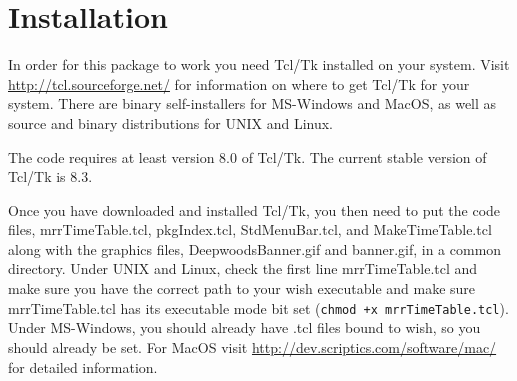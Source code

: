 
\chapter{Installation}
\label{chapt:Installation}

In order for this package to work you need Tcl/Tk installed on your
system.  Visit \url{http://tcl.sourceforge.net/} for information on where to
get Tcl/Tk for your system.  There are binary self-installers for
MS-Windows and MacOS, as well as source and binary distributions for
UNIX and Linux.

The code requires at least version 8.0 of Tcl/Tk.  The current stable
version of Tcl/Tk is 8.3.

Once you have downloaded and installed Tcl/Tk, you then need to put the
code files, mrrTimeTable.tcl, pkgIndex.tcl, StdMenuBar.tcl, and
MakeTimeTable.tcl along with the graphics files, DeepwoodsBanner.gif and
banner.gif, in a common directory.  Under UNIX and Linux, check the
first line mrrTimeTable.tcl and make sure you have the correct path to
your wish executable and make sure mrrTimeTable.tcl has its executable
mode bit set ({\tt chmod +x mrrTimeTable.tcl}).  Under MS-Windows, you should
already have .tcl files bound to wish, so you should already be set. 
For MacOS visit \url{http://dev.scriptics.com/software/mac/} for detailed
information.

